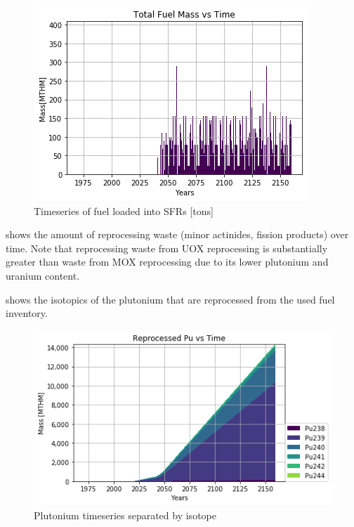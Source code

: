\begin{figure}[htbp!]
	\begin{center}
		\includegraphics[scale=0.7]{./images/french-transition/fuel_no_cum.png}
	\end{center}
	\caption{Timeseries of fuel loaded into \glspl{SFR} [tons]}
	\label{fig:fuel}
\end{figure}

 shows the amount of reprocessing waste
(minor actinides, fission products) over time. Note that 
reprocessing waste from \gls{UOX} reprocessing is substantially
greater than waste from \gls{MOX} reprocessing due to its lower
plutonium and uranium content.

 shows the isotopics of the plutonium that are
reprocessed from the used fuel inventory.

\begin{figure}[htbp!]
	\begin{center}
		\includegraphics[scale=0.7]{./images/french-transition/rep_pu.png}
	\end{center}
	\caption{Plutonium timeseries separated by isotope}
	\label{fig:pu_isotopics}
\end{figure}

